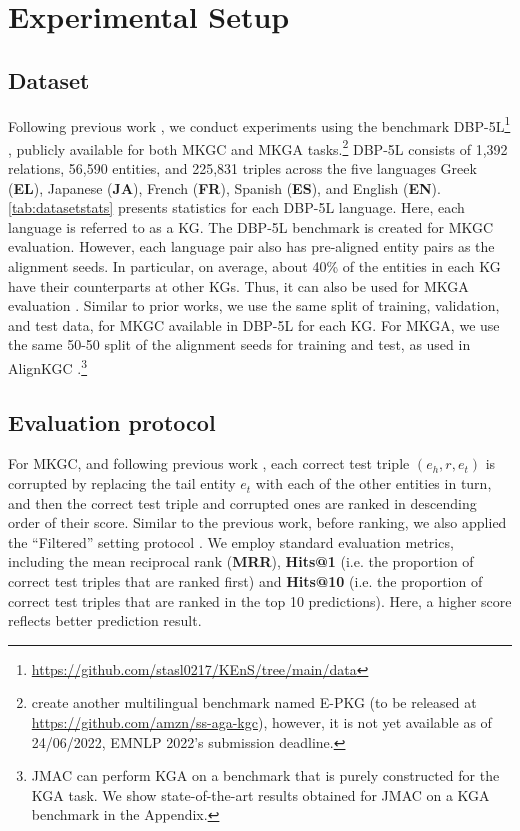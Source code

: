 \documentclass[11pt]{article}
\begin{document}
\section{Experimental Setup} 

\subsection{Dataset}





Following previous work \cite{singh2021multilingual,huang2022multilingual}, we conduct experiments using the benchmark DBP-5L\footnote{\url{https://github.com/stasl0217/KEnS/tree/main/data}} \cite{chen2020multilingual}, publicly available for both MKGC and MKGA tasks.\footnote{ create another multilingual benchmark named E-PKG (to be released at \url{https://github.com/amzn/ss-aga-kgc}), however, it is not yet available as of 24/06/2022, EMNLP 2022's submission deadline.}  DBP-5L consists of 1,392 relations, 56,590 entities, and 225,831 triples across the five languages Greek (\textbf{EL}), Japanese (\textbf{JA}), French (\textbf{FR}), Spanish (\textbf{ES}), and English (\textbf{EN}). \autoref{tab:datasetstats} presents statistics for each DBP-5L language.  Here, each language is referred to as a KG. The DBP-5L benchmark is created for MKGC evaluation. However, each language pair also has pre-aligned entity pairs as the alignment seeds. In particular, on average, about 40\% of the entities in each KG have their counterparts at other KGs. Thus, it can also be used for MKGA evaluation \cite{singh2021multilingual}.  
Similar to prior works, we use the same split of training, validation, and test data, for MKGC available in DBP-5L for each KG. For MKGA, we use the same 50-50 split of the alignment seeds for training and test, as used in  AlignKGC \cite{singh2021multilingual}.\footnote{JMAC can perform KGA on a benchmark that is purely constructed for the KGA task. We show state-of-the-art results obtained for JMAC on a KGA benchmark in the Appendix.}

\subsection{Evaluation protocol}

For MKGC, and following previous work \cite{chen2020multilingual, singh2021multilingual,huang2022multilingual}, each correct test triple $(e_h, r, e_t)$ is corrupted by replacing the tail entity $e_t$ with each of the other entities in turn, and then the correct test triple and corrupted ones are ranked in descending order of their score. Similar to the previous work, before ranking, we also applied the ``Filtered'' setting protocol \cite{bordes2013translating}. We employ standard evaluation metrics, including the mean reciprocal rank (\textbf{MRR}), \textbf{Hits@1} (i.e. the proportion of correct test triples that are ranked first) and \textbf{Hits@10} (i.e. the proportion of correct test triples that are ranked in the top 10 predictions). Here, a higher score reflects better prediction result. 
\end{document}
